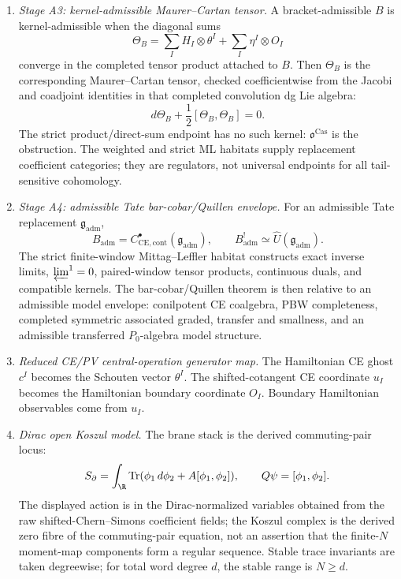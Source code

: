 \begin{enumerate}
  \item \emph{Stage A3: kernel-admissible Maurer--Cartan tensor.}
  A bracket-admissible \(B\) is kernel-admissible when the diagonal sums
  \[
    \Theta_B=\sum_I H_I\otimes\theta^I+\sum_I\eta^I\otimes O_I
  \]
  converge in the completed tensor product attached to \(B\).  Then
  \(\Theta_B\) is the corresponding Maurer--Cartan tensor, checked
  coefficientwise from the Jacobi and coadjoint identities in that
  completed convolution dg Lie algebra:
  \[
    d\Theta_B+\frac12[\Theta_B,\Theta_B]=0.
  \]
  The strict product/direct-sum endpoint has no such kernel:
  \(\mathfrak o^{\mathrm{Cas}}\) is the obstruction.  The weighted and
  strict ML habitats supply replacement coefficient categories; they are
  regulators, not universal endpoints for all tail-sensitive cohomology.

	  \item \emph{Stage A4: admissible Tate bar-cobar/Quillen envelope.}
  For an admissible Tate replacement
  \(\mathfrak g_{\mathrm{adm}}\),
  \[
    B_{\mathrm{adm}}=
    C^\bullet_{\mathrm{CE},\mathrm{cont}}(\mathfrak g_{\mathrm{adm}}),
    \qquad
    B_{\mathrm{adm}}^!\simeq
    \widehat U(\mathfrak g_{\mathrm{adm}}).
  \]
  The strict finite-window Mittag--Leffler habitat constructs exact
  inverse limits, \(\varprojlim^1=0\), paired-window tensor products,
  continuous duals, and compatible kernels.  The bar-cobar/Quillen
  theorem is then relative to an admissible model envelope: conilpotent
  CE coalgebra, PBW completeness, completed symmetric associated
  graded, transfer and smallness, and an admissible transferred
  \(P_0\)-algebra model structure.

  \item \emph{Reduced CE/PV central-operation generator map.}
  The Hamiltonian CE ghost \(c^I\) becomes the Schouten vector
  \(\theta^I\).  The shifted-cotangent CE coordinate \(u_I\) becomes the
  Hamiltonian boundary coordinate \(O_I\).  Boundary Hamiltonian
  observables come from \(u_I\).

  \item \emph{Dirac open Koszul model.}
  The brane stack is the derived commuting-pair locus:
  \[
    S_\partial=\int_\R\operatorname{Tr}
    (\phi_1\,d\phi_2+A[\phi_1,\phi_2]),\qquad
    Q\psi=[\phi_1,\phi_2].
  \]
  The displayed action is in the Dirac-normalized variables obtained from
  the raw shifted-Chern--Simons coefficient fields; the Koszul complex is
  the derived zero fibre of the commuting-pair equation, not an assertion
  that the finite-\(N\) moment-map components form a regular sequence.
  Stable trace invariants are taken degreewise; for total word degree
  \(d\), the stable range is \(N\ge d\).


\end{enumerate}
